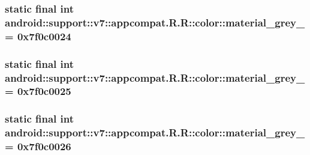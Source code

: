 \hypertarget{classandroid_1_1support_1_1v7_1_1appcompat_1_1_r_1_1color_aa56a96395fd866e1897834091fd6531}{
\subsubsection[{material\_\-grey\_\-100}]{\setlength{\rightskip}{0pt plus 5cm}static final int android::support::v7::appcompat.R.R::color::material\_\-grey\_ = 0x7f0c0024}}
\label{classandroid_1_1support_1_1v7_1_1appcompat_1_1_r_1_1color_aa56a96395fd866e1897834091fd6531}


\hypertarget{classandroid_1_1support_1_1v7_1_1appcompat_1_1_r_1_1color_f182270cd0ff582a2d0438373627c65a}{
\subsubsection[{material\_\-grey\_\-300}]{\setlength{\rightskip}{0pt plus 5cm}static final int android::support::v7::appcompat.R.R::color::material\_\-grey\_ = 0x7f0c0025}}
\label{classandroid_1_1support_1_1v7_1_1appcompat_1_1_r_1_1color_f182270cd0ff582a2d0438373627c65a}


\hypertarget{classandroid_1_1support_1_1v7_1_1appcompat_1_1_r_1_1color_e98a9bdd1a0c6c48eee5757a938ea620}{
\subsubsection[{material\_\-grey\_\-50}]{\setlength{\rightskip}{0pt plus 5cm}static final int android::support::v7::appcompat.R.R::color::material\_\-grey\_ = 0x7f0c0026}}
\label{classandroid_1_1support_1_1v7_1_1appcompat_1_1_r_1_1color_e98a9bdd1a0c6c48eee5757a938ea620}


